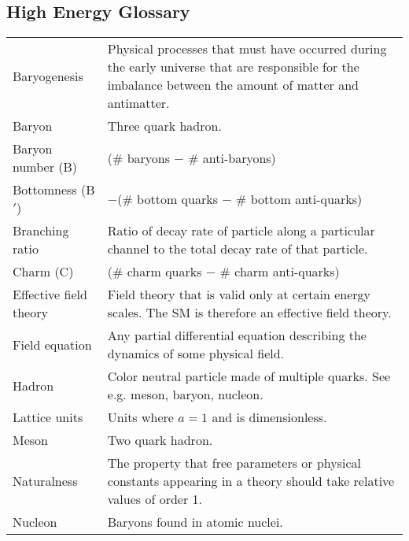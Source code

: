 \documentclass[12pt]{book}
\theoremstyle{definition}
\newenvironment{frontstuff}
  {\centering\chapter*{}}
  {\clearpage}
\begin{document}
\begin{frontstuff}
\section*{High Energy Glossary}
\begin{tabularx}{\linewidth}{lL}
Baryogenesis&
  Physical processes that must have occurred
  during the early universe that are responsible for the imbalance between
  the amount of matter and antimatter.
\vspace{2mm}\\
Baryon& 
  Three quark hadron.
\vspace{2mm}\\
Baryon number (B)& 
  (\# baryons $-$ \# anti-baryons)
\vspace{2mm}\\
Bottomness (B$'$)& 
  $-$(\# bottom quarks $-$ \# bottom anti-quarks)
\vspace{2mm}\\
Branching ratio& 
  Ratio of decay rate of particle along a particular channel
  to the total decay rate of that particle.
\vspace{2mm}\\
Charm (C)& 
  (\# charm quarks $-$ \# charm anti-quarks)
\vspace{2mm}\\
Effective field theory&
  Field theory that is valid only at certain energy scales. The SM is 
  therefore an effective field theory.
\vspace{2mm}\\
Field equation&
  Any partial differential equation describing the dynamics of
  some physical field.
\vspace{2mm}\\
Hadron& 
  Color neutral particle made of multiple quarks. See e.g. meson, baryon, 
  nucleon.
\vspace{2mm}\\
Lattice units&
  Units where $a=1$ and is dimensionless.
\vspace{2mm}\\
Meson& 
  Two quark hadron.
\vspace{2mm}\\
Naturalness&
  The property that free parameters or physical constants appearing in a theory
  should take relative values of order 1.
\vspace{2mm}\\
Nucleon& 
  Baryons found in atomic nuclei.
\vspace{2mm}\\

\end{tabularx}
\end{frontstuff}
\end{document}
